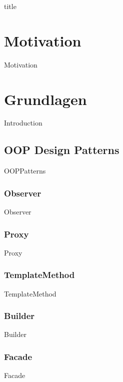\documentclass{article}
\begin{document}
{title}

\frontmatter

\tableofcontents

\listoffigures
\listoftables

\mainmatter

\section{Motivation}
    {Motivation}

\section{Grundlagen}
    {Introduction}

    \subsection{OOP Design Patterns}
        {OOPPatterns}

        \subsubsection{Observer}
            {Observer}

        \subsubsection{Proxy}
            {Proxy}

        \subsubsection{TemplateMethod}
            {TemplateMethod}

        \subsubsection{Builder}
            {Builder}

        \subsubsection{Facade}
            {Facade}
\end{document}
